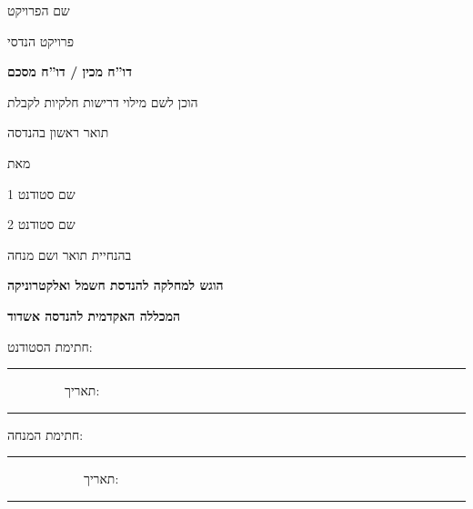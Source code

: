 \documentclass[12pt]{book}
\numberwithin{equation}{section}
\numberwithin{figure}{section}
\numberwithin{table}{section}
\begin{document}
\vspace*{0.1cm}
\begin{center}
\fontsize{16pt}{19pt}
\selectfont

{\Large שם הפרויקט}
\vspace*{0.5cm}

{\Large פרויקט הנדסי}

\vspace*{1cm}

\fontsize{14pt}{17pt}
\selectfont

\textbf{דו''ח מכין / דו''ח מסכם}
\vspace*{1.5cm}

\fontsize{10pt}{12pt}
\selectfont

הוכן לשם מילוי דרישות חלקיות לקבלת

תואר ראשון בהנדסה 

\vspace*{1cm}

מאת

\vspace*{1cm}

\fontsize{16pt}{19pt}
\selectfont

{\Large שם סטודנט 1}

\vspace*{0.5cm}

{\Large שם סטודנט 2}

\fontsize{12pt}{12pt}
\selectfont

\vspace*{1cm}

בהנחיית תואר ושם מנחה

\vspace*{2cm}

\fontsize{14pt}{17pt}
\selectfont

\textbf{הוגש למחלקה להנדסת חשמל ואלקטרוניקה}
  
\textbf{המכללה האקדמית להנדסה אשדוד}

\vspace*{3cm}
\end{center}

\fontsize{10pt}{12pt}
\selectfont

חתימת הסטודנט: \rule{3cm}{1pt} ~~~~~~~~~תאריך: \rule{3cm}{1pt}

\vspace*{0.5cm}

חתימת המנחה: \rule{3cm}{1pt} ~~~~~~~~~~~~תאריך: \rule{3cm}{1pt}

\vspace*{0.5cm}
\end{document}
